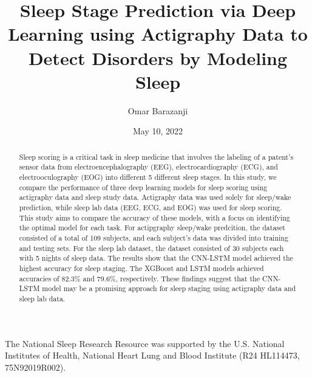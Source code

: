 \documentclass[12pt]{report}
\title{Sleep Stage Prediction via Deep Learning
using Actigraphy Data to Detect Disorders
by Modeling Sleep}
\author{Omar Barazanji}
\date{May 10, 2022} %
\begin{document}
\begin{romanpages}      %

\TitlePage 


\begin{abstract} 
  Sleep scoring is a critical task in sleep medicine that involves the labeling of a patent's sensor data from electroencephalography (EEG), electrocardiography (ECG), and electrooculography (EOG) into different 5 different sleep stages. In this study, we compare the performance of three deep learning models for sleep scoring using actigraphy data and sleep study data. Actigraphy data was used solely for sleep/wake prediction, while sleep lab data (EEG, ECG, and EOG) was used for sleep scoring. This study aims to compare the accuracy of these models, with a focus on identifying the optimal model for each task. For actipgraphy sleep/wake predcition, the dataset consisted of a total of 109 subjects, and each subject's data was divided into training and testing sets. For the sleep lab dataset, the dataset consisted of 30 subjects each with 5 nights of sleep data. The results show that the CNN-LSTM model achieved the highest accuracy for sleep staging. The XGBoost and LSTM models achieved accuracies of 82.3\% and 79.6\%, respectively. These findings suggest that the CNN-LSTM model may be a promising approach for sleep staging using actigraphy data and sleep lab data.
\end{abstract}


\begin{acknowledgments}
  The National Sleep Research Resource was supported by the U.S. National Institutes of Health, National Heart Lung and Blood Institute (R24 HL114473, 75N92019R002).
\end{acknowledgments}

\tableofcontents
\listoffigures

\printnomenclature[0.5in] %
\end{romanpages}        %
\end{document}
